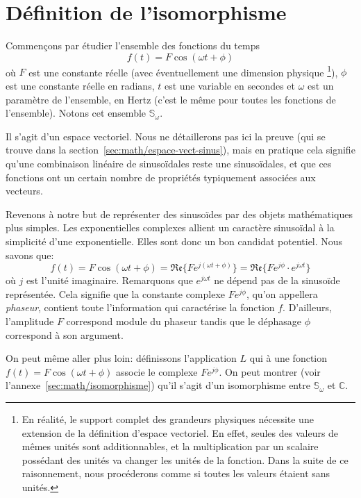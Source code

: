 \section{Définition de l'isomorphisme}
Commençons par étudier l'ensemble des fonctions du temps
\[
    f(t) = F\cos(\omega t + \phi)
\]
où $F$ est une constante réelle (avec éventuellement une dimension physique
\footnote{
    En réalité, le support complet des grandeurs physiques
    nécessite une extension de la définition d'espace vectoriel.
    En effet, seules des valeurs de mêmes unités sont additionnables,
    et la multiplication par un scalaire possédant des unités
    va changer les unités de la fonction.
    Dans la suite de ce raisonnement,
    nous procéderons comme si toutes les valeurs étaient sans unités.
}),
$\phi$ est une constante réelle en radians,
$t$ est une variable en secondes
et $\omega$ est un paramètre de l'ensemble, en Hertz
(c'est le même pour toutes les fonctions de l'ensemble).
Notons cet ensemble $\mathbb{S}_\omega$.

Il s'agit d'un espace vectoriel.
Nous ne détaillerons pas ici la preuve
(qui se trouve dans la section~\ref{sec:math/espace-vect-sinus}),
mais en pratique cela signifie qu'une combinaison linéaire
de sinusoïdales reste une sinusoïdales,
et que ces fonctions ont un certain nombre de propriétés
typiquement associées aux vecteurs.

Revenons à notre but de représenter des sinusoïdes
par des objets mathématiques plus simples.
Les exponentielles complexes allient un caractère sinusoïdal à
la simplicité d'une exponentielle.
Elles sont donc un bon candidat potentiel.
Nous savons que:
\begin{equation}
    f(t) = F\cos(\omega t + \phi) = \mathfrak{Re}\{Fe^{j(\omega t + \phi)}\}
    = \mathfrak{Re}\{Fe^{j\phi}\cdot e^{j\omega t}\}
\end{equation}
où $j$ est l'unité imaginaire.
Remarquons que $e^{j\omega t}$ ne dépend pas de la sinusoïde représentée.
Cela signifie que la constante complexe $Fe^{j\phi}$,
qu'on appellera \emph{phaseur}, contient
toute l'information qui caractérise la fonction $f$.
D'ailleurs, l'amplitude $F$ correspond module du phaseur
tandis que le déphasage $\phi$ correspond à son argument.

On peut même aller plus loin: définissons l'application $L$
qui à une fonction $f(t) = F\cos(\omega t + \phi)$
associe le complexe $Fe^{j\phi}$.
On peut montrer (voir l'annexe~\ref{sec:math/isomorphisme}) qu'il s'agit d'un
isomorphisme entre $\mathbb{S}_\omega$ et $\mathbb{C}$.

